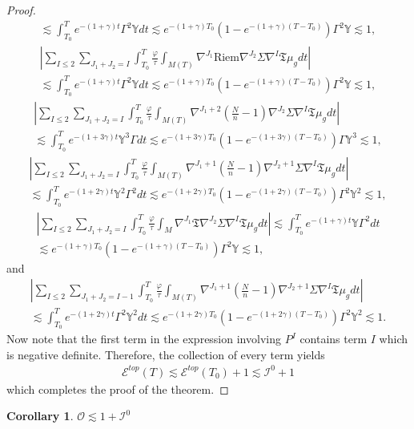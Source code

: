 \documentclass{amsart}
\newtheorem{corollary}{Corollary}[section]
\begin{document}
\begin{proof}
\begin{align}
 \lesssim \int_{T_{0}}^{T}e^{-(1+\gamma)t}\Gamma^{2}\mathds{Y}dt\lesssim e^{-(1+\gamma) T_{0}}(1-e^{-(1+\gamma)(T-T_{0})})\Gamma^{2}\mathds{Y} \lesssim 1,
\end{align}
\begin{align}
 |\sum_{I\leq 2}\sum_{J_{1}+J_{2}=I}\int_{T_{0}}^{T}\frac{\varphi}{\tau}\int_{M(T)}\nabla^{J_{1}}\text{Riem}\nabla^{J_{2}}\Sigma\nabla^{I}\mathfrak{T}\mu_{g}dt|\\\nonumber
 \lesssim \int_{T_{0}}^{T}e^{-(1+\gamma)t}\Gamma^{2}\mathds{Y}dt\lesssim e^{-(1+\gamma) T_{0}}(1-e^{-(1+\gamma)(T-T_{0})})\Gamma^{2}\mathds{Y} \lesssim 1,
\end{align}
\begin{align}
 |\sum_{I\leq 2}\sum_{J_{1}+J_{2}=I}\int_{T_{0}}^{T}\frac{\varphi}{\tau}\int_{M(T)}\nabla^{J_{1}+2}(\frac{N}{n}-1)\nabla^{J_{2}}\Sigma\nabla^{I}\mathfrak{T}\mu_{g}dt|\\\nonumber 
 \lesssim \int_{T_{0}}^{T}e^{-(1+3\gamma)t}\mathds{Y}^{3}\Gamma dt\lesssim e^{-(1+3\gamma) T_{0}}(1-e^{-(1+3\gamma)(T-T_{0})})\Gamma\mathds{Y}^{3} \lesssim 1,
\end{align}
\begin{align}
 |\sum_{I\leq 2}\sum_{J_{1}+J_{2}=I}\int_{T_{0}}^{T}\frac{\varphi}{\tau}\int_{M(T)}\nabla^{J_{1}+1}(\frac{N}{n}-1)\nabla^{J_{2}+1}\Sigma\nabla^{I}\mathfrak{T}\mu_{g}dt|\\\nonumber 
 \lesssim \int_{T_{0}}^{T}e^{-(1+2\gamma)t}\mathds{Y}^{2}\Gamma^{2}dt\lesssim e^{-(1+2\gamma) T_{0}}(1-e^{-(1+2\gamma)(T-T_{0})})\Gamma^{2}\mathds{Y}^{2} \lesssim 1,
\end{align}
\begin{align}
|\sum_{I\leq 2}\sum_{J_{1}+J_{2}=I}\int_{T_{0}}^{T}\frac{\varphi}{\tau}\int_{M}\nabla^{J_{1}}\mathfrak{T}\nabla^{J_{2}}\Sigma \nabla^{I}\mathfrak{T}\mu_{g}dt|\lesssim \int_{T_{0}}^{T}e^{-(1+\gamma)t}\mathds{Y}\Gamma^{2}dt\\\nonumber \lesssim e^{-(1+\gamma) T_{0}}(1-e^{-(1+\gamma)(T-T_{0})})\Gamma^{2}\mathds{Y}\lesssim 1,
\end{align}
and 
\begin{align}
|\sum_{I\leq 2}\sum_{J_{1}+J_{2}=I-1}\int_{T_{0}}^{T}\frac{\varphi}{\tau}\int_{M(T)}\nabla^{J_{1}+1}(\frac{N}{n}-1)\nabla^{J_{2}+1}\Sigma\nabla^{I}\mathfrak{T}\mu_{g}dt|\\\nonumber \lesssim \int_{T_{0}}^{T}e^{-(1+2\gamma)t}\Gamma^{2}\mathds{Y}^{2}dt\lesssim e^{-(1+2\gamma) T_{0}}(1-e^{-(1+2\gamma)(T-T_{0})})\Gamma^{2}\mathds{Y}^{2}\lesssim 1.     
\end{align}
Now note that the first term in the expression involving $P^{I}$ contains term $I$ which is negative definite. Therefore, the collection of every term yields 
\begin{align}
 \mathscr{E}^{top}(T)\lesssim \mathscr{E}^{top}(T_{0})+1\lesssim \mathcal{I}^{0}+1   
\end{align}
which completes the proof of the theorem. 
\end{proof}
\begin{corollary}
 $\mathcal{O}\lesssim 1+\mathcal{I}^{0}$   
\end{corollary}
\end{document}
